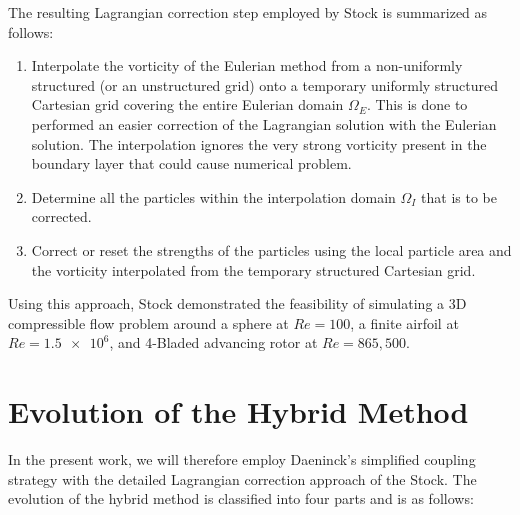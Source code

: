 	The resulting Lagrangian correction step employed by Stock is summarized as follows:
	
	\begin{enumerate}
	\item Interpolate the vorticity of the Eulerian method from a non-uniformly structured (or an unstructured grid) onto a temporary uniformly structured Cartesian grid covering the entire Eulerian domain $\Omega_E$. This is done to performed an easier correction of the Lagrangian solution with the Eulerian solution. The interpolation ignores the very strong vorticity present in the boundary layer that could cause numerical problem.
	\item Determine all the particles within the interpolation domain $\Omega_I$ that is to be corrected.
	\item Correct or reset the strengths of the particles using the local particle area and the vorticity interpolated from the temporary structured Cartesian grid.
	\end{enumerate}
	
	Using this approach, Stock demonstrated the feasibility of simulating a 3D compressible flow problem around a sphere at $Re=100$, a finite airfoil at $Re=\num{1.5e6}$, and 4-Bladed advancing rotor at $Re=865,500$.
	
	\section{Evolution of the Hybrid Method}

	In the present work, we will therefore employ Daeninck's simplified coupling strategy with the detailed Lagrangian correction approach of the Stock. The evolution of the hybrid method is classified into four parts and is as follows:

